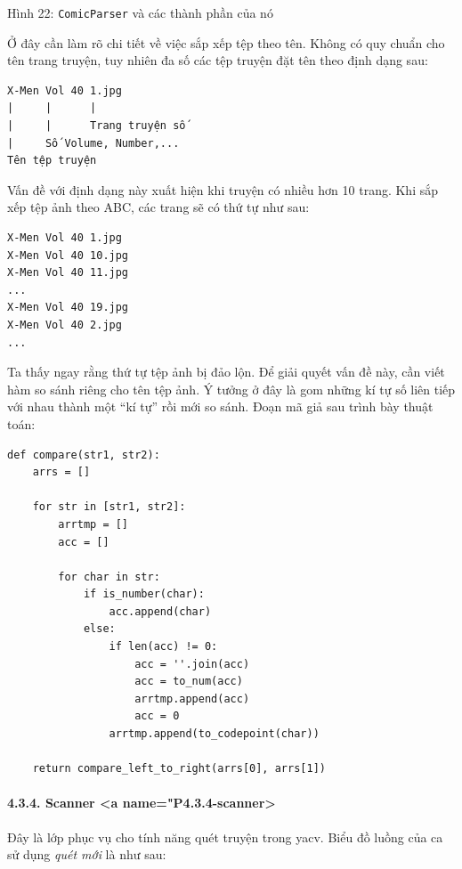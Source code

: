 \documentclass[
]{article}
\begin{document}
Hình 22: \texttt{ComicParser} và các thành phần của nó

Ở đây cần làm rõ chi tiết về việc sắp xếp tệp theo tên. Không có quy
chuẩn cho tên trang truyện, tuy nhiên đa số các tệp truyện đặt tên theo
định dạng sau:

\begin{verbatim}
X-Men Vol 40 1.jpg
|     |      |
|     |      Trang truyện số
|     Số Volume, Number,...
Tên tệp truyện
\end{verbatim}

Vấn đề với định dạng này xuất hiện khi truyện có nhiều hơn 10 trang. Khi
sắp xếp tệp ảnh theo ABC, các trang sẽ có thứ tự như sau:

\begin{verbatim}
X-Men Vol 40 1.jpg
X-Men Vol 40 10.jpg
X-Men Vol 40 11.jpg
...
X-Men Vol 40 19.jpg
X-Men Vol 40 2.jpg
...
\end{verbatim}

Ta thấy ngay rằng thứ tự tệp ảnh bị đảo lộn. Để giải quyết vấn đề này,
cần viết hàm so sánh riêng cho tên tệp ảnh. Ý tưởng ở đây là gom những
kí tự số liên tiếp với nhau thành một ``kí tự'' rồi mới so sánh. Đoạn mã
giả sau trình bày thuật toán:

\begin{verbatim}
def compare(str1, str2):
    arrs = []

    for str in [str1, str2]:
        arrtmp = []
        acc = []

        for char in str:
            if is_number(char):
                acc.append(char)
            else:
                if len(acc) != 0:
                    acc = ''.join(acc)
                    acc = to_num(acc)
                    arrtmp.append(acc)
                    acc = 0
                arrtmp.append(to_codepoint(char))

    return compare_left_to_right(arrs[0], arrs[1])
\end{verbatim}

\hypertarget{scanner-a-namep4.3.4-scanner}{%
\paragraph{4.3.4. Scanner \textless a
name="P4.3.4-scanner>}\label{scanner-a-namep4.3.4-scanner}}

Đây là lớp phục vụ cho tính năng quét truyện trong yacv. Biểu đồ luồng
của ca sử dụng \emph{quét mới} là như sau:
\end{document}
